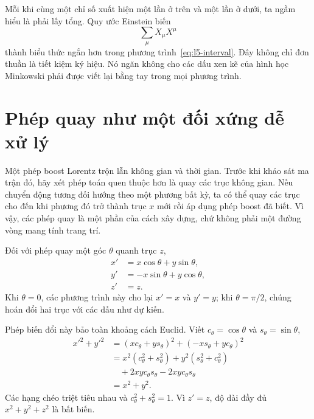 Mỗi khi cùng một chỉ số xuất hiện một lần ở trên và một lần ở dưới, ta ngầm hiểu là phải lấy tổng. Quy ước Einstein biến
\begin{equation}
\sum_{\mu}X_\mu X^\mu
\end{equation}
thành biểu thức ngắn hơn trong phương trình~\eqref{eq:l5-interval}. Đây không chỉ đơn thuần là tiết kiệm ký hiệu. Nó ngăn không cho các dấu xen kẽ của hình học Minkowski phải được viết lại bằng tay trong mọi phương trình.

\begin{classroomqa}
\end{classroomqa}

\section{Phép quay như một đối xứng dễ xử lý}

Một phép boost Lorentz trộn lẫn không gian và thời gian. Trước khi khảo sát ma trận đó, hãy xét phép toán quen thuộc hơn là quay các trục không gian. Nếu chuyển động tương đối hướng theo một phương bất kỳ, ta có thể quay các trục cho đến khi phương đó trở thành trục \(x\) mới rồi áp dụng phép boost đã biết. Vì vậy, các phép quay là một phần của cách xây dựng, chứ không phải một đường vòng mang tính trang trí.

Đối với phép quay một góc \(\theta\) quanh trục \(z\),
\begin{align}
x'&=x\cos\theta+y\sin\theta,\nonumber\\
y'&=-x\sin\theta+y\cos\theta,\label{eq:l5-rotation}\\
z'&=z.\nonumber
\end{align}
Khi \(\theta=0\), các phương trình này cho lại \(x'=x\) và \(y'=y\); khi \(\theta=\pi/2\), chúng hoán đổi hai trục với các dấu như dự kiến.

Phép biến đổi này bảo toàn khoảng cách Euclid. Viết
\(c_\theta=\cos\theta\) và \(s_\theta=\sin\theta\),
\begin{align}
x'^2+y'^2
&=(xc_\theta+ys_\theta)^2+(-xs_\theta+yc_\theta)^2\nonumber\\
&=x^2(c_\theta^2+s_\theta^2)
  +y^2(s_\theta^2+c_\theta^2)\nonumber\\
&\quad+2xyc_\theta s_\theta-2xyc_\theta s_\theta\nonumber\\
&=x^2+y^2.
\end{align}
Các hạng chéo triệt tiêu nhau và \(c_\theta^2+s_\theta^2=1\). Vì \(z'=z\),
độ dài đầy đủ \(x^2+y^2+z^2\) là bất biến.

